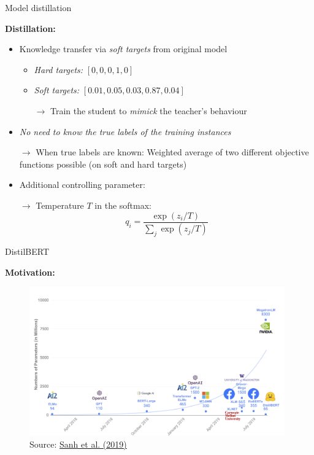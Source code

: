 \begin{frame}{Model distillation \href{https://arxiv.org/pdf/1503.02531.pdf}{}}

\vfill

\textbf{Distillation:}

\begin{itemize}
	\item Knowledge transfer via \textit{soft targets} from original model
		\begin{itemize}
			\item \textit{Hard targets:} $[0, 0, 0, 1, 0]$
			\item \textit{Soft targets:} $[0.01, 0.05, 0.03, 0.87, 0.04]$
			\item[$\to$] Train the student to \textit{mimick} the teacher's behaviour
		\end{itemize}
	\item \textit{No need to know the true labels of the training instances}
	\item[$\to$] When true labels are known: Weighted average of two different objective functions possible (on soft and hard targets)
	\item Additional controlling parameter:
	\item[$\to$] Temperature $T$ in the softmax: $$q_i = \frac{\exp(z_i/T)}{\sum_j \exp(z_j/T)}$$
\end{itemize}

\vfill

\end{frame}


\begin{frame}{DistilBERT \href{https://arxiv.org/pdf/1910.01108.pdf}{}}

\textbf{Motivation:}
	\begin{figure}
		\centering
		\includegraphics[width = 11cm]{figure/distilbert-motivation}\\ 
		{\footnotesize Source: \href{https://arxiv.org/pdf/1910.01108.pdf}{Sanh et al. (2019)}}
	\end{figure}
	
\end{frame}

